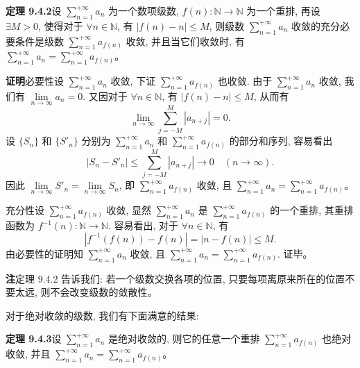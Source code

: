 \documentclass[UTF8,12pt,a4paper,fontset=fandol]{ctexart}
\begin{document}
\noindent\textbf{定理 9.4.2}\quad 设 $\sum\limits_{n=1}^{+\infty}a_n$ 为一个数项级数, $f(n):\mathbb{N}\to\mathbb{N}$ 为一个重排, 再设 $\exists M>0$, 使得对于 $\forall n\in\mathbb{N}$, 有 $|f(n)-n|\leq M$, 则级数 $\sum\limits_{n=1}^{+\infty}a_n$ 收敛的充分必要条件是级数 $\sum\limits_{n=1}^{+\infty}a_{f(n)}$ 收敛, 并且当它们收敛时, 有 $\sum\limits_{n=1}^{+\infty}a_n=\sum\limits_{n=1}^{+\infty}a_{f(n)}$。

\noindent\textbf{证明}\quad 必要性\quad 设 $\sum\limits_{n=1}^{+\infty}a_n$ 收敛, 下证 $\sum\limits_{n=1}^{+\infty}a_{f(n)}$ 也收敛. 由于 $\sum\limits_{n=1}^{+\infty}a_n$ 收敛, 我们有 $\lim\limits_{n\to\infty}a_n=0$. 又因对于 $\forall n\in\mathbb{N}$, 有 $|f(n)-n|\leq M$, 从而有
\[
  \lim_{n\to\infty}\sum_{j=-M}^{M}|a_{n+j}|=0.
\]
设 $\{S_n\}$ 和 $\{S'_n\}$ 分别为 $\sum\limits_{n=1}^{+\infty}a_n$ 和 $\sum\limits_{n=1}^{+\infty}a_{f(n)}$ 的部分和序列, 容易看出
\[
  |S_n-S'_n|\leq\sum_{j=-M}^{M}|a_{n+j}|\to0\quad(n\to\infty).
\]
因此 $\lim\limits_{n\to\infty}S'_n=\lim\limits_{n\to\infty}S_n$, 即 $\sum\limits_{n=1}^{+\infty}a_{f(n)}$ 收敛, 且 $\sum\limits_{n=1}^{+\infty}a_n=\sum\limits_{n=1}^{+\infty}a_{f(n)}$。

充分性\quad 设 $\sum\limits_{n=1}^{+\infty}a_{f(n)}$ 收敛, 显然 $\sum\limits_{n=1}^{+\infty}a_n$ 是 $\sum\limits_{n=1}^{+\infty}a_{f(n)}$ 的一个重排, 其重排函数为 $f^{-1}(n):\mathbb{N}\to\mathbb{N}$. 容易看出, 对于 $\forall n\in\mathbb{N}$, 有
\[
  |f^{-1}(f(n))-f(n)|=|n-f(n)|\leq M.
\]
由必要性的证明知 $\sum\limits_{n=1}^{+\infty}a_n$ 收敛, 且 $\sum\limits_{n=1}^{+\infty}a_n=\sum\limits_{n=1}^{+\infty}a_{f(n)}$. 证毕。

\noindent\textbf{注}\quad 定理 9.4.2 告诉我们: 若一个级数交换各项的位置, 只要每项离原来所在的位置不要太远, 则不会改变级数的敛散性。

对于绝对收敛的级数, 我们有下面满意的结果:

\noindent\textbf{定理 9.4.3}\quad 设 $\sum\limits_{n=1}^{+\infty}a_n$ 是绝对收敛的, 则它的任意一个重排 $\sum\limits_{n=1}^{+\infty}a_{f(n)}$ 也绝对收敛, 并且 $\sum\limits_{n=1}^{+\infty}a_n=\sum\limits_{n=1}^{+\infty}a_{f(n)}$。
\end{document}
